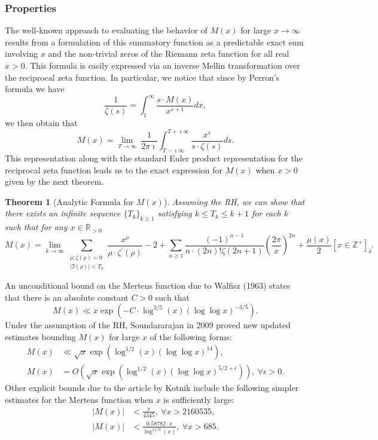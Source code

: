 \documentclass[11pt,reqno,a4letter]{article}
\numberwithin{figure}{section}
\numberwithin{table}{section}
\newcommand{\Iverson}[1]{\ensuremath{\left[#1\right]_{\delta}}}
\theoremstyle{plain}
\newtheorem{theorem}{Theorem}
\numberwithin{theorem}{section}
\theoremstyle{definition}
\begin{document}
\subsubsection{Properties} 

The well-known approach to evaluating the behavior of $M(x)$ for large 
$x \rightarrow \infty$ results from a formulation of this summatory 
function as a predictable exact sum involving $x$ and the non-trivial 
zeros of the Riemann zeta function for all real $x > 0$. 
This formula is easily expressed via an inverse Mellin transformation 
over the reciprocal zeta function. In particular, 
we notice that since by Perron's formula we have 
\[
\frac{1}{\zeta(s)} = \int_1^{\infty} \frac{s \cdot M(x)}{x^{s+1}} dx, 
\]
we then obtain that 
\[
M(x) = \lim_{T \rightarrow \infty}\ \frac{1}{2\pi\imath} \int_{T-\imath\infty}^{T+\imath\infty} 
     \frac{x^s}{s \cdot \zeta(s)} ds. 
\] 
This representation along with the standard Euler product 
representation for the reciprocal zeta function leads us to the 
exact expression for $M(x)$ when $x > 0$ given by the next theorem. 

\begin{theorem}[Analytic Formula for $M(x)$] 
\label{theorem_MxMellinTransformInvFormula} 
Assuming the RH, we can show that there exists an infinite sequence 
$\{T_k\}_{k \geq 1}$ satisfying $k \leq T_k \leq k+1$ for each $k$ 
such that for any $x \in \mathbb{R}_{>0}$ 
\[
M(x) = \lim_{k \rightarrow \infty} 
     \sum_{\substack{\rho: \zeta(\rho) = 0 \\ |\Im(\rho)| < T_k}} 
     \frac{x^{\rho}}{\rho \cdot \zeta^{\prime}(\rho)} - 2 + 
     \sum_{n \geq 1} \frac{(-1)^{n-1}}{n \cdot (2n)! \zeta(2n+1)} 
     \left(\frac{2\pi}{x}\right)^{2n} + 
     \frac{\mu(x)}{2} \Iverson{x \in \mathbb{Z}^{+}}. 
\] 
\end{theorem} 

An unconditional bound on the Mertens function due to Walfisz (1963) 
states that there is an absolute constant $C > 0$ such that 
$$M(x) \ll x \exp\left(-C \cdot \log^{3/5}(x) 
  (\log\log x)^{-3/5}\right).$$ 
Under the assumption of the RH, Soundararajan in 2009 proved new updated estimates 
bounding $M(x)$ for large $x$ of the following forms: 
\begin{align*} 
M(x) & \ll \sqrt{x} \exp\left(\log^{1/2}(x) (\log\log x)^{14}\right), \\ 
M(x) & = O\left(\sqrt{x} \exp\left( 
     \log^{1/2}(x) (\log\log x)^{5/2+\epsilon}\right)\right),\ 
     \forall \epsilon > 0. 
\end{align*} 
Other explicit bounds due to the article by Kotnik include the following 
simpler estimates for the Mertens function when $x$ is sufficiently 
large: 
\begin{align*} 
|M(x)| & < \frac{x}{4345},\ \forall x > 2160535, \\ 
|M(x)| & < \frac{0.58782 \cdot x}{\log^{11/9}(x)},\ \forall x > 685. 
\end{align*} 
\end{document}
